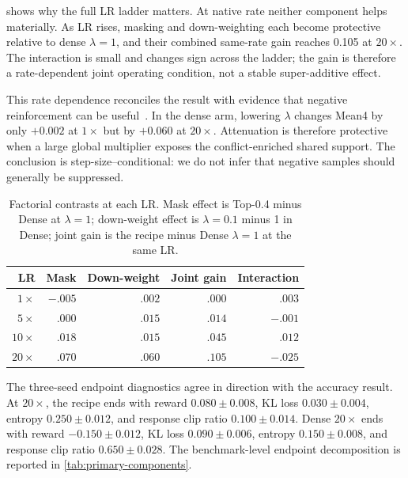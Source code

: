 \documentclass[5p,times]{elsarticle}
\begin{document}
 shows why the full LR ladder matters. At native rate neither
component helps materially. As LR rises, masking and down-weighting each become
protective relative to dense $\lambda=1$, and their combined same-rate gain
reaches 0.105 at $20\times$. The interaction is small and changes sign across
the ladder; the gain is therefore a rate-dependent joint operating condition,
not a stable super-additive effect.

This rate dependence reconciles the result with evidence that negative
reinforcement can be useful~\cite{deng2025negativegrad,
zhu2025negativereinforcement}. In the dense arm, lowering $\lambda$ changes
Mean4 by only $+0.002$ at $1\times$ but by $+0.060$ at $20\times$.
Attenuation is therefore protective when a large global multiplier exposes the
conflict-enriched shared support. The conclusion is step-size--conditional: we
do not infer that negative samples should generally be suppressed.

\begin{table}[t]
\centering
\caption{Factorial contrasts at each LR. Mask effect is Top-0.4 minus Dense at
$\lambda=1$; down-weight effect is $\lambda=0.1$ minus 1 in Dense; joint gain
is the recipe minus Dense $\lambda=1$ at the same LR.}
\label{tab:effects}
\footnotesize\setlength{\tabcolsep}{3pt}
\begin{tabular}{rrrrr}
\toprule LR & Mask & Down-weight & Joint gain & Interaction\\
\midrule
$1\times$  & $-.005$ & $.002$ & $.000$ & $.003$\\
$5\times$  & $.000$  & $.015$ & $.014$ & $-.001$\\
$10\times$ & $.018$  & $.015$ & $.045$ & $.012$\\
$20\times$ & $.070$  & $.060$ & $.105$ & $-.025$\\
\bottomrule
\end{tabular}
\end{table}

The three-seed endpoint diagnostics agree in direction with the accuracy
result. At $20\times$, the recipe ends with reward $0.080\pm0.008$, KL loss
$0.030\pm0.004$, entropy $0.250\pm0.012$, and response clip ratio
$0.100\pm0.014$. Dense $20\times$ ends with reward $-0.150\pm0.012$, KL loss
$0.090\pm0.006$, entropy $0.150\pm0.008$, and response clip ratio
$0.650\pm0.028$.
The benchmark-level endpoint decomposition is reported in
\cref{tab:primary-components}.
\end{document}
